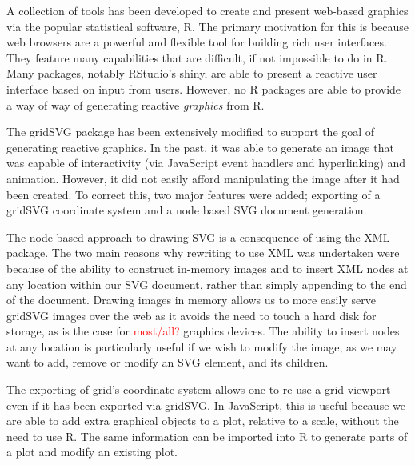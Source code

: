 \documentclass[11pt, a4paper]{article}
\title{\doctitle{}}
\author{\docauthor{} \\ \url{simon.potter@auckland.ac.nz}}
\date{\docdate{}}
\newcommand{\grid}{\textsf{grid}}
\newcommand{\R}{\textsf{R}}
\newcommand{\gridSVG}{\textsf{gridSVG}}
\newcommand{\JS}{\textsf{JavaScript}}
\newcommand{\pkg}[1]{\textsf{#1}}
\newcommand{\tsc}[1]{{\small \textsc{#1}}}
\begin{document}
\maketitle

A collection of tools has been developed to create and present
web-based graphics via the popular statistical software, \R{}. The
primary motivation for this is because web browsers are a powerful and
flexible tool for building rich user interfaces. They feature many
capabilities that are difficult, if not impossible to do in \R{}. Many
packages, notably RStudio's \pkg{shiny}, are able to present a
reactive user interface based on input from users. However, no \R{}
packages are able to provide a way of way of generating reactive
\emph{graphics} from \R{}.

The \gridSVG{} package has been extensively modified to support the
goal of generating reactive graphics. In the past, it was able to
generate an image that was capable of interactivity (via \JS{} event
handlers and hyperlinking) and animation. However, it did not easily
afford manipulating the image after it had been created. To correct
this, two major features were added; exporting of a \gridSVG{}
coordinate system and a node based \tsc{SVG} document generation.

The node based approach to drawing \tsc{SVG} is a consequence of using
the \pkg{XML} package. The two main reasons why rewriting to use
\pkg{XML} was undertaken were because of the ability to construct
in-memory images and to insert \tsc{XML} nodes at any location within
our \tsc{SVG} document, rather than simply appending to the end of the
document. Drawing images in memory allows us to more easily serve
\gridSVG{} images over the web as it avoids the need to touch a hard
disk for storage, as is the case for \textcolor{red}{most/all?}
graphics devices. The ability to insert nodes at any location is
particularly useful if we wish to modify the image, as we may want to
add, remove or modify an \tsc{SVG} element, and its children.

The exporting of \grid{}'s coordinate system allows one to re-use a
\grid{} viewport even if it has been exported via \gridSVG{}. In
\JS{}, this is useful because we are able to add extra graphical
objects to a plot, relative to a scale, without the need to use
\R{}. The same information can be imported into \R{} to generate parts
of a plot and modify an existing plot.
\end{document}
